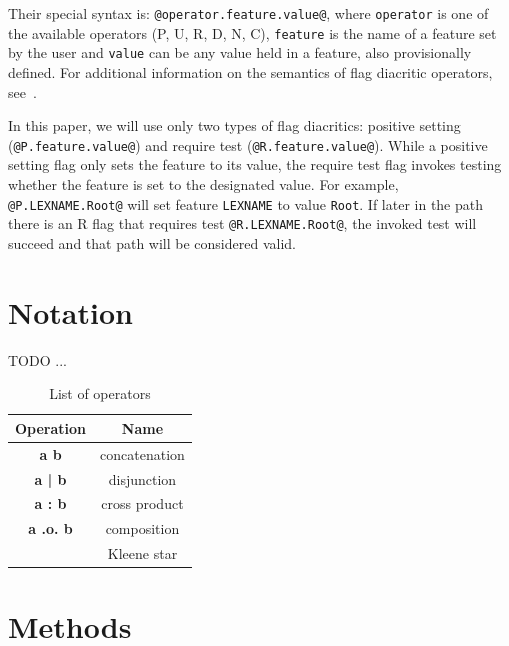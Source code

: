\documentclass[11pt]{article}
\begin{document}
Their special syntax is: \verb+@operator.feature.value@+, where
\texttt{operator} is one of the available operators (P, U, R, D, N, C), \texttt{feature} is the name of a feature set by the user and \texttt{value} can be any value held in a feature, also provisionally defined. For additional information on the semantics of flag diacritic operators, see~.


In this paper, we will use only two types of flag diacritics: positive
setting (\verb+@P.feature.value@+) and require test
(\verb+@R.feature.value@+). While a positive setting flag only sets the
feature to its value, the require test flag invokes testing whether the
feature is set to the designated value. For example,
\verb+@P.LEXNAME.Root@+ will set feature \texttt{LEXNAME} to value
\texttt{Root}. If later in the path there is an R flag that requires test
\verb+@R.LEXNAME.Root@+, the invoked test will succeed and that path
will be considered valid.


\section{Notation}
\label{sec:notation}
TODO ...


\begin{table}[h]
    \centering
    \begin{tabular}{|c|c|}
        \hline
        \bf Operation & \bf Name \\
        \hline\hline
        \bf a b & concatenation  \\
        \bf a | b & disjunction  \\
        \bf a : b & cross product  \\
        \bf a .o. b & composition  \\
        \bf * & Kleene star  \\
        

        \hline
    \end{tabular}
    \caption{List of operators
    \label{table:operators}}
\end{table}




\section{Methods}
\label{sec:methods}
\end{document}
